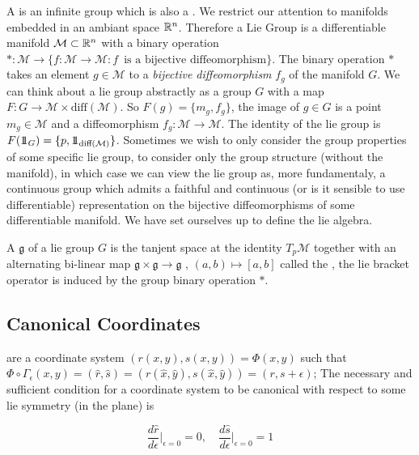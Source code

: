 \documentclass[12pt]{article}
\begin{document}
A  is an infinite group which is also a . We restrict our attention to manifolds embedded in an ambiant space $\mathbb{R}^n$. Therefore a Lie Group is a differentiable manifold $\mathcal M\subset \mathbb{R}^n$ with a binary operation $\ast : \mathcal M \to \{f:\mathcal M \to \mathcal M : f\,\text{ is a bijective diffeomorphism}\}$. The binary operation $\ast$ takes an element $g\in \mathcal M$ to a \textit{bijective diffeomorphism} $f_g$ of the manifold $G$. We can think about a lie group abstractly as a group $G$ with a map $F : G\to \mathcal M \times \text{diff} (\mathcal M)$. So $F(g) = \{m_g,f_g\}$, the image of $g\in G$ is a point $m_g\in\mathcal M$ and a diffeomorphism $f_g : \mathcal M \to \mathcal M$. The identity of the lie group is $F(1\!\!1_G) = \{p , 1\!\!1_{\text{diff}(\mathcal M)}\}$. Sometimes we wish to only consider the group properties of some specific lie group, to consider only the group structure (without the manifold), in which case we can view the lie group as, more fundamentaly, a continuous group which admits a faithful and continuous (or is it sensible to use differentiable) representation on the bijective diffeomorphisms of some differentiable manifold. We have set ourselves up to define the lie algebra. 

A  $\mathfrak g$ of a lie group $G$ is the tanjent space at the identity $T_p\mathcal M$ together with an alternating bi-linear map $\mathfrak g\times \mathfrak g \to \mathfrak g$ , $(a,b)\mapsto [a,b]$ called the , the lie bracket operator is induced by the group binary operation $\ast$. 

 
\subsection{Canonical Coordinates}
 are a coordinate system $(r(x,y),s(x,y)) =\Phi (x,y)$ such that $\Phi\circ \Gamma_\epsilon (x,y) = (\hat r, \hat s) = (r(\hat x,\hat y),s(\hat x,\hat y)) = (r,s+\epsilon)$; The necessary and sufficient condition for a coordinate system to be canonical with respect to some lie symmetry (in the plane) is 

\begin{equation}\label{eq:canonical coordinates condition}
    \frac{d\hat r}{d\epsilon}\bigg|_{\epsilon=0}=0,\quad \frac{d\hat s}{d\epsilon}\bigg|_{\epsilon=0}=1
\end{equation}
\end{document}
